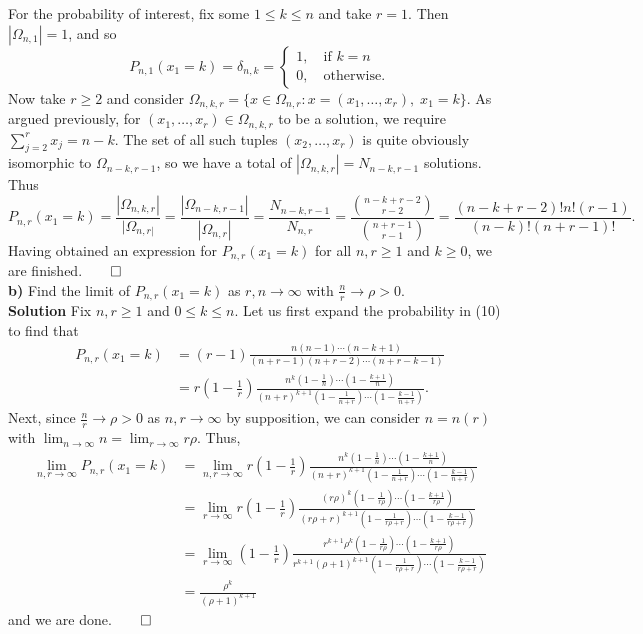 \documentclass[10pt]{article}
\newcommand{\1}[1]{\mathbbm{1}_{#1}}
\newcommand{\nck}[2]{{#1\choose#2}}
\begin{document}
    For the probability of interest, fix some $1\leq k\leq n$ and take $r=1$. Then $|\Omega_{n,1}|=1$, and so
    \[P_{n,1}(x_1=k)=\delta_{n,k}=\begin{cases}
        1,\quad\text{if $k=n$}\\
        0,\quad\text{otherwise.}
    \end{cases}\]
    Now take $r\geq 2$ and consider $\Omega_{n,k,r}=\{x\in\Omega_{n,r}:x=(x_1,\dots,x_r),\;x_1=k\}$. As argued previously, for $(x_1,\dots,x_r)\in\Omega_{n,k,r}$ to be a solution, we require $\sum_{j=2}^rx_j=n-k$. The set of all such tuples $(x_2,\dots,x_r)$ is
    quite obviously isomorphic to $\Omega_{n-k,r-1}$, so we have a total of $|\Omega_{n,k,r}|=N_{n-k,r-1}$ solutions. Thus
    \[P_{n,r}(x_1=k)=\frac{|\Omega_{n,k,r}|}{|\Omega_{n,r|}}=\frac{|\Omega_{n-k,r-1}|}{|\Omega_{n,r}|}=\frac{N_{n-k,r-1}}{N_{n,r}}=\frac{\nck{n-k+r-2}{r-2}}{\nck{n+r-1}{r-1}}=\frac{(n-k+r-2)!n!(r-1)}{(n-k)!(n+r-1)!}.\tag{10}\]
    Having obtained an expression for $P_{n,r}(x_1=k)$ for all $n,r\geq 1$ and $k\geq 0$, we are finished.\hfill{$\qed$}\\[5pt]
    {\bf b)} Find the limit of $P_{n,r}(x_1=k)$ as $r,n\rightarrow\infty$ with $\frac{n}{r}\rightarrow\rho>0$.\\[5pt]
    {\bf Solution}\hspace{5pt} Fix $n,r\geq 1$ and $0\leq k\leq n$. Let us first expand the probability in (10) to find that
    \begin{align*}
        P_{n,r}(x_1=k)&=(r-1)\frac{{n(n-1)\cdots(n-k+1)}}{(n+r-1)(n+r-2)\cdots(n+r-k-1)}\\
        &=r(1-\frac{1}{r})\frac{n^k(1-\frac{1}{n})\cdots(1-\frac{k+1}{n})}{(n+r)^{k+1}(1-\frac{1}{n+r})\cdots(1-\frac{k-1}{n+r})}.
    \end{align*}
    Next, since $\frac{n}{r}\rightarrow\rho>0$ as $n,r\rightarrow\infty$ by supposition, we can consider $n=n(r)$ with $\lim_{n\rightarrow\infty}n=\lim_{r\rightarrow\infty}r\rho$. Thus,
    \begin{align*}
        \lim_{n,r\rightarrow\infty}P_{n,r}(x_1=k)&=\lim_{n,r\rightarrow\infty}r(1-\frac{1}{r})\frac{n^k(1-\frac{1}{n})\cdots(1-\frac{k+1}{n})}{(n+r)^{k+1}(1-\frac{1}{n+r})\cdots(1-\frac{k-1}{n+r})}\\
        &=\lim_{r\rightarrow\infty}r(1-\frac{1}{r})\frac{(r\rho)^k(1-\frac{1}{r\rho})\cdots(1-\frac{k+1}{r\rho})}{(r\rho+r)^{k+1}(1-\frac{1}{r\rho+r})\cdots(1-\frac{k-1}{r\rho+r})}\\
        &=\lim_{r\rightarrow\infty}(1-\frac{1}{r})\frac{r^{k+1}\rho^k(1-\frac{1}{r\rho})\cdots(1-\frac{k+1}{r\rho})}{r^{k+1}(\rho+1)^{k+1}(1-\frac{1}{r\rho+r})\cdots(1-\frac{k-1}{r\rho+r})}\\
        &=\frac{\rho^k}{(\rho+1)^{k+1}}
    \end{align*}
    and we are done.\hfill{$\qed$}\\[5pt]
\end{document}
